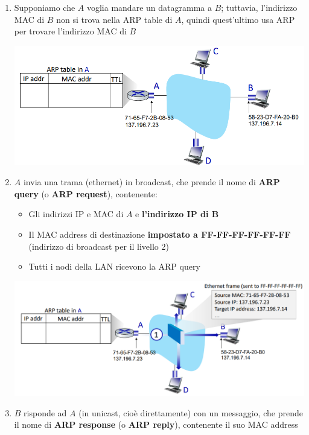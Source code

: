 \documentclass[12pt]{article}
\begin{document}
\begin{enumerate}
    \item Supponiamo che $A$ voglia mandare un datagramma a $B$; tuttavia, l'indirizzo MAC di $B$ non si trova nella ARP table di $A$, quindi quest'ultimo usa ARP per trovare l'indirizzo MAC di $B$
    \begin{center}
        \includegraphics[width =1\linewidth]{Images/127.png}
    \end{center}
    \item $A$ invia una trama (ethernet) in broadcast, che prende il nome di \textbf{ARP query} (o \textbf{ARP request}), contenente:
    \begin{itemize}
        \item Gli indirizzi IP e MAC di $A$ e \textbf{l'indirizzo IP di B}
        \item Il MAC address di destinazione \textbf{impostato a FF-FF-FF-FF-FF-FF} (indirizzo di broadcast per il livello 2)
        \item Tutti i nodi della LAN ricevono la ARP query
    \end{itemize}
    \begin{center}
        \includegraphics[width =1\linewidth]{Images/128.png}
    \end{center}
    \item $B$ risponde ad $A$ (in unicast, cioè direttamente) con un messaggio, che prende il nome di \textbf{ARP response} (o \textbf{ARP reply}), contenente il suo MAC address

\end{enumerate}
\end{document}
